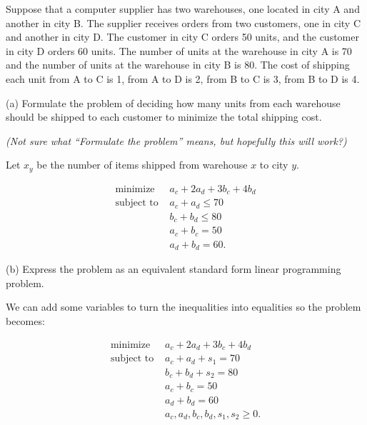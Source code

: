 \documentclass[12pt]{extarticle}
\theoremstyle{definition}
\begin{document}
\begin{problem}
 Suppose that a computer supplier has two warehouses, one located in city A and another in city B. The supplier receives orders from two customers, one in city C and another in city D. The customer in city C orders 50 units, and the customer in city D orders 60 units. The number of units at the warehouse in city A is 70 and the number of units at the warehouse in city B is 80. The cost of shipping each unit from A to C is 1, from A to D is 2, from B to C is 3, from B to D is 4.



 	\begin{description}
		\item{(a)} Formulate the problem of deciding how many units from each warehouse should 
		be shipped to each customer to minimize the total shipping cost.

			\textit{(Not sure what ``Formulate the problem'' means, but hopefully this will work?)}

			Let $x_y$ be the number of items shipped from warehouse $x$ to city $y$.

			\begin{align*}
			\text{minimize } &a_c + 2a_d + 3b_c + 4b_d\\
			\text{subject to } &a_c + a_d \leq 70\\
			&b_c + b_d \leq 80\\
			&a_c + b_c = 50\\
			&a_d + b_d = 60.
			\end{align*} 

		\item{(b)} Express the problem as an equivalent standard form linear programming problem.

			We can add some variables to turn the inequalities into equalities so the problem becomes:
			
			\begin{align*}
			\text{minimize } &a_c + 2a_d + 3b_c + 4b_d\\
			\text{subject to } &a_c + a_d + s_1 = 70\\
			&b_c + b_d + s_2 = 80\\
			&a_c + b_c = 50\\
			&a_d + b_d = 60\\
			&a_c, a_d, b_c, b_d, s_1, s_2 \geq 0.
			\end{align*} 


	\end{description}
\end{problem}
\end{document}
